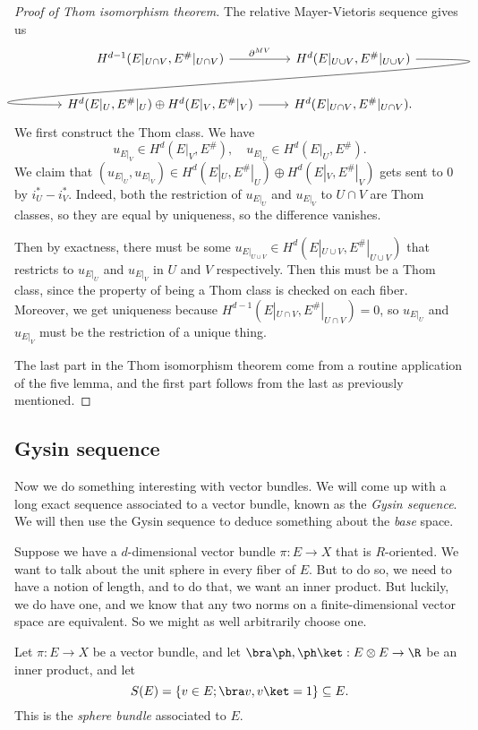 \documentclass[a4paper]{article}
\begin{document}
\begin{proof}[Proof of Thom isomorphism theorem]
  The relative Mayer-Vietoris sequence gives us
  \[
    \begin{tikzcd}
      H^{d - 1}(E|_{U \cap V}, E^\#|_{U \cap V}) \ar[r, "\partial^{MV}"] & H^d(E|_{U\cup V}, E^\#|_{U\cup V}) \ar[out=0, in=180, looseness=2, overlay, dl]\\
      H^d(E|_U, E^\#|_U) \oplus H^d(E|_V, E^\#|_V) \ar[r] & H^d(E|_{U \cap V}, E^\#|_{U \cap V}).
    \end{tikzcd}
  \]
  We first construct the Thom class. We have
  \[
    u_{E|_V} \in H^d(E|_V, E^\#),\quad u_{E|_U} \in H^d(E|_U, E^\#).
  \]
  We claim that $(u_{E|_U}, u_{E|_V}) \in H^d(E|_U, E^\#|_U) \oplus H^d(E|_V, E^\#|_V)$ gets sent to $0$ by $i_U^* - i_V^*$. Indeed, both the restriction of $u_{E|_U}$ and $u_{E|_V}$ to $U \cap V$ are Thom classes, so they are equal by uniqueness, so the difference vanishes.

  Then by exactness, there must be some $u_{E|_{U\cup V}} \in H^d(E|_{U \cup V}, E^\#|_{U \cup V})$ that restricts to $u_{E|_U}$ and $u_{E|_V}$ in $U$ and $V$ respectively. Then this must be a Thom class, since the property of being a Thom class is checked on each fiber. Moreover, we get uniqueness because $H^{d - 1}(E|_{U \cap V}, E^\#|_{U \cap V}) = 0$, so $u_{E|_U}$ and $u_{E|_V}$ must be the restriction of a unique thing.

  The last part in the Thom isomorphism theorem come from a routine application of the five lemma, and the first part follows from the last as previously mentioned.
\end{proof}

\subsection{Gysin sequence}
Now we do something interesting with vector bundles. We will come up with a long exact sequence associated to a vector bundle, known as the \emph{Gysin sequence}. We will then use the Gysin sequence to deduce something about the \emph{base} space.

Suppose we have a $d$-dimensional vector bundle $\pi: E \to X$ that is $R$-oriented. We want to talk about the unit sphere in every fiber of $E$. But to do so, we need to have a notion of length, and to do that, we want an inner product. But luckily, we do have one, and we know that any two norms on a finite-dimensional vector space are equivalent. So we might as well arbitrarily choose one.

\begin{defi}
  Let $\pi: E \to X$ be a vector bundle, and let $\bra \ph, \ph\ket : E \otimes E \to \R$ be an inner product, and let
  \[
    S(E) = \{v \in E; \bra v, v\ket = 1\} \subseteq E.
  \]
  This is the \emph{sphere bundle} associated to $E$.
\end{defi}
\end{document}
